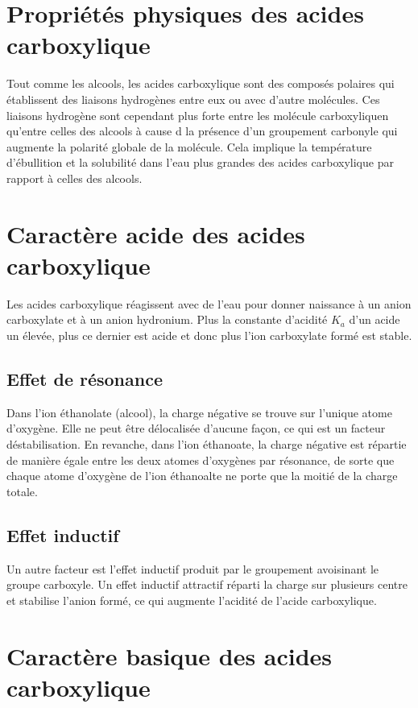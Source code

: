 \section{Propriétés physiques des acides carboxylique}

Tout comme les alcools, les acides carboxylique sont des composés polaires qui établissent des liaisons hydrogènes entre eux ou avec d'autre molécules.
Ces liaisons hydrogène sont cependant plus forte entre les molécule carboxyliquen qu'entre celles des alcools à cause d la présence d'un groupement carbonyle qui augmente la polarité globale de la molécule.
Cela implique la température d'ébullition et la solubilité dans l'eau plus grandes des acides carboxylique par rapport à celles des alcools.

\section{Caractère acide des acides carboxylique}

Les acides carboxylique réagissent avec de l'eau pour donner naissance à un anion carboxylate et à un anion hydronium.
Plus la constante d'acidité $K_a$  d'un acide un élevée, plus ce dernier est acide et donc plus l'ion carboxylate formé est stable.


\subsection{Effet de résonance}

Dans l'ion éthanolate (alcool), la charge négative se trouve sur l'unique atome d'oxygène.
Elle ne peut être délocalisée d'aucune façon, ce qui est un facteur déstabilisation.
En revanche, dans l'ion éthanoate, la charge négative est répartie de manière égale entre les deux atomes d'oxygènes par résonance, de sorte que chaque atome d'oxygène de l'ion éthanoalte ne porte que la moitié de la charge totale.

\subsection{Effet inductif}
Un autre facteur est l'effet inductif produit par le groupement avoisinant le groupe carboxyle.
Un effet inductif attractif réparti la charge sur plusieurs centre et stabilise l'anion formé, ce qui augmente l'acidité de l'acide carboxylique.

\section{Caractère basique des acides carboxylique}

